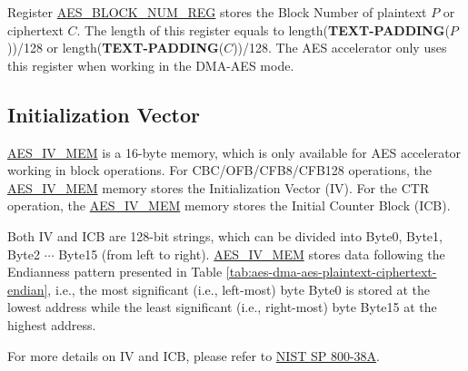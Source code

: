 \documentclass[main\_\_EN.tex]{subfiles}
\begin{document}
Register \hyperref[regdesc:AESBLOCKNUMREG]{AES\_BLOCK\_NUM\_REG} stores the Block Number of plaintext $P$ or ciphertext $C$. The length of this register equals to length({\bfseries TEXT-PADDING}($P$))/128 or length({\bfseries TEXT-PADDING}($C$))/128. The AES accelerator only uses this register when working in the DMA-AES mode.

\subsection{Initialization Vector}\label{sec:aes-init-vector}

\label{memdesc:AESIVMEM}\hyperref[memdesc:AESIVMEM]{AES\_IV\_MEM} is a 16-byte memory, which is only available for AES accelerator working in block operations. For CBC/OFB/CFB8/CFB128 operations, the \hyperref[memdesc:AESIVMEM]{AES\_IV\_MEM} memory stores the Initialization Vector (IV). For the CTR operation, the \hyperref[memdesc:AESIVMEM]{AES\_IV\_MEM} memory stores the Initial Counter Block (ICB).

Both IV and ICB are 128-bit strings, which can be divided into Byte0, Byte1, Byte2 \begin{math}\cdots\end{math} Byte15 (from left to right). \hyperref[memdesc:AESIVMEM]{AES\_IV\_MEM} stores data following the Endianness pattern presented in Table \ref{tab:aes-dma-aes-plaintext-ciphertext-endian}, i.e., the most significant (i.e., left-most) byte Byte0 is stored at the lowest address while the least significant (i.e., right-most) byte Byte15 at the highest address.

For more details on IV and ICB, please refer to \href{https://nvlpubs.nist.gov/nistpubs/Legacy/SP/nistspecialpublication800-38a.pdf}{NIST SP 800-38A}.
\end{document}
